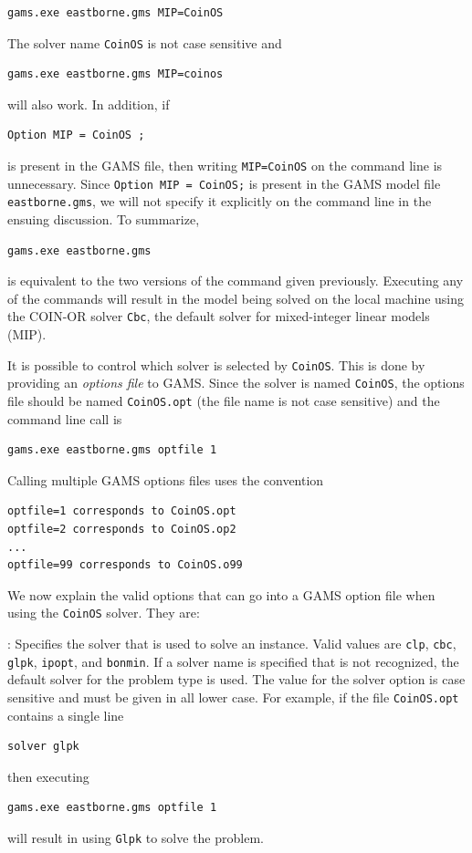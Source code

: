 \documentclass[11pt]{article}
\renewcommand{\_}{{\char"5F}}
\renewcommand{\{}{{\char"7B}}
\renewcommand{\}}{{\char"7D}}
\renewcommand{\^}{{\char"0D}}
\renewcommand{\'}{{\char"0D}}
\begin{document}
\begin{enumerate}[Step 1:]
\begin{verbatim}
gams.exe eastborne.gms MIP=CoinOS
\end{verbatim}
The solver name {\tt CoinOS} is not case sensitive and 
\begin{verbatim}
gams.exe eastborne.gms MIP=coinos
\end{verbatim}
will also work.  In addition, if
\begin{verbatim}
Option MIP = CoinOS ;
\end{verbatim}
is present in the GAMS file, then writing {\tt MIP=CoinOS} on the command line is unnecessary.
Since {\tt Option MIP = CoinOS;} is present in the GAMS model file {\tt eastborne.gms}, 
we will not specify it explicitly on the command line in the ensuing discussion. To summarize,
\begin{verbatim}
gams.exe eastborne.gms 
\end{verbatim}
is equivalent to the two versions of the command given previously.  Executing any of the commands will 
result in the model being solved on the local machine using the COIN-OR solver {\tt Cbc}, the default solver 
for 
mixed-integer linear models (MIP).

It is possible to control which solver is selected by {\tt CoinOS}.    This is done by providing an {\it options file}  to  GAMS.   
Since the solver is named {\tt  CoinOS}, the options file should  be named {\tt CoinOS.opt}  (the file name is not case sensitive)
and the command line call is 
\begin{verbatim}
gams.exe eastborne.gms optfile 1
\end{verbatim}
Calling multiple GAMS options files uses the convention
\begin{verbatim}
optfile=1 corresponds to CoinOS.opt
optfile=2 corresponds to CoinOS.op2
...
optfile=99 corresponds to CoinOS.o99
\end{verbatim}

We now explain the valid options that can go into a GAMS option file when using the {\tt CoinOS} solver.  They are:

\vskip 8pt
:   Specifies the solver that is used to solve an instance. 
Valid values are {\tt clp},  {\tt cbc}, {\tt glpk}, {\tt ipopt},  and {\tt bonmin}.  
If a solver name is specified that is not recognized, the default solver for the problem type is used.  
The value for the solver option is case sensitive and must be given in all lower case. 
For example, if the file {\tt CoinOS.opt} contains a single line
\begin{verbatim}
solver glpk
\end{verbatim}
then executing
\begin{verbatim}
gams.exe eastborne.gms optfile 1
\end{verbatim}
will result in  using {\tt Glpk}  to solve the problem.   



\end{enumerate}
\end{document}
